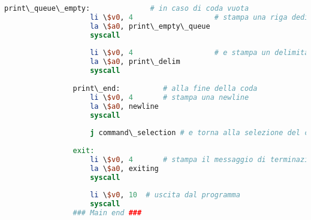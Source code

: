 \begin{center}
\begin{lstlisting}[language=mips, gobble=14, stepnumber=1]
                print\_queue\_empty:              # in caso di coda vuota
                    li \$v0, 4                   # stampa una riga dedicata
                    la \$a0, print\_empty\_queue
                    syscall
                    
                    li \$v0, 4                   # e stampa un delimitatore
                    la \$a0, print\_delim
                    syscall
                    
                print\_end:          # alla fine della coda
                    li \$v0, 4       # stampa una newline
                    la \$a0, newline
                    syscall
                    
                    j command\_selection # e torna alla selezione del comando
                    
                exit:
                    li \$v0, 4       # stampa il messaggio di terminazione
                    la \$a0, exiting
                    syscall
                    
                    li \$v0, 10  # uscita dal programma
                    syscall
                ### Main end ###\end{lstlisting}
        \end{center}
